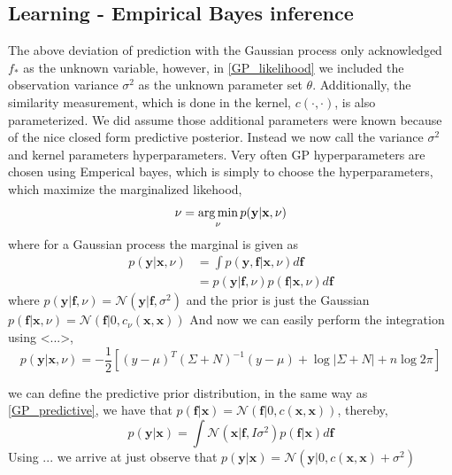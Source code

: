 \subsection{Learning - Empirical Bayes inference}

The above deviation of prediction with the Gaussian process only acknowledged $f_*$ as the unknown
variable, however, in \eqref{GP_likelihood} we included the observation variance $\sigma^2$
as the unknown parameter set $\theta$. Additionally, the similarity measurement, which is done in the kernel, 
 $c(\cdot , \cdot )$, is also parameterized. We did assume those additional parameters were known because
of the nice closed form predictive posterior. Instead we now call the variance $\sigma^2$ and
kernel parameters hyperparameters. Very often GP hyperparameters are chosen using Emperical bayes, which is simply
to choose the hyperparameters, which maximize the marginalized likehood,  
$$\nu = \operatorname*{arg\,min}_{\nu} p(\textbf{y}|\textbf{x}, \nu)$$
where for a Gaussian process the marginal is given as 
\begin{align*}
    p(\textbf{y}|\textbf{x}, \nu) &= \int  p(\textbf{y}, \textbf{f}|\textbf{x}, \nu) d\textbf{f}\\
    &= p(\textbf{y}|\textbf{f},\nu)p(\textbf{f}|\textbf{x},\nu) d\textbf{f}
\end{align*}
where  $p(\textbf{y}|\textbf{f},\nu) = \mathcal{N}(\textbf{y}|\textbf{f},\sigma^2)$ and the prior is
just the Gaussian $p(\textbf{f}|\textbf{x},\nu) = \mathcal{N}(\textbf{f}|0, c_{\nu}(\textbf{x}, \textbf{x}))$
And now we can easily perform the integration using <...>, 
$$p(\textbf{y}|\textbf{x}, \nu) = -\frac{1}{2}[(y-\mu)^T (\Sigma+N)^{-1}(y-\mu)+ \log |\Sigma+N|+n \log 2\pi]$$

we can define the predictive prior distribution, in the same way as \eqref{GP_predictive}, we have that
$p(\textbf{f}| \textbf{x}) = \mathcal{N}(\textbf{f}|0, c(\textbf{x},\textbf{x}))$, thereby, 
\begin{equation}\label{GP_predictive_prior}
    p(\textbf{y}|\textbf{x}) = \int \mathcal{N}(\textbf{x}|\textbf{f}, I\sigma^2) p(\textbf{f}|\textbf{x})d\textbf{f}
\end{equation}
Using ... we arrive at 
just observe that $p(\textbf{y}|\textbf{x}) = \mathcal{N}(\textbf{y}|0, c(\textbf{x},\textbf{x})+ \sigma^2)$


